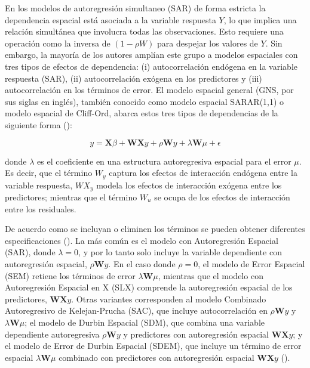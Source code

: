 \documentclass[
  manuscript=article,  
  layout=preprint,  
  year=2023,
  volume=0,
]{format}
\begin{document}
En los modelos de autoregresión simultaneo (SAR) de forma estricta la dependencia espacial está asociada a la variable respuesta $Y$, lo que implica una relación simultánea que involucra todas las observaciones. Esto requiere una operación como la inversa de $(1-\rho W)$ para despejar los valores de $Y$. Sin embargo, la mayoría de los autores amplían este grupo a modelos espaciales con tres tipos de efectos de dependencia: (i) autocorrelación endógena en la variable respuesta (SAR), (ii) autocorrelación exógena en los predictores y (iii) autocorrelación en los términos de error. El modelo espacial general (GNS, por sus siglas en inglés), también conocido como modelo espacial SARAR(1,1) o modelo espacial de Cliff-Ord, abarca estos tres tipos de dependencias de la siguiente forma (\cite{lesage2009introduction, kelejian2007relative, cliff1981spatial}):

\begin{equation} \label{eq:2} y = \textbf{X} \beta + \textbf{W} \textbf{X} y + \rho \textbf{W} y + \lambda \textbf{W} \mu + \epsilon \end{equation}

\par donde $\lambda$ es el coeficiente en una estructura autoregresiva espacial para el error $\mu$. Es decir, que el término $W_y$ captura los efectos de interacción endógena entre la variable respuesta,  $WX_y$ modela los efectos de interacción exógena entre los predictores; mientras que el término $W_u$ se ocupa de los efectos de interacción entre los residuales.

\par De acuerdo como se incluyan o eliminen los términos se pueden obtener diferentes especificaciones (\cite{elhorst2013spatial}). La más común es el modelo con Autoregresión Espacial (SAR), donde $\lambda=0$, y por lo tanto solo incluye la variable dependiente con autoregresión espacial, $\rho \textbf{W}y$. En el caso donde $\rho=0$, el modelo de Error Espacial (SEM) retiene los términos de error $\lambda \textbf{W} \mu$, mientras que el modelo con Autoregresión Espacial en X (SLX) comprende la autoregresión espacial de los predictores, $\textbf{W} \textbf{X} y$. Otras variantes corresponden al modelo Combinado Autoregresivo de Kelejan-Prucha (SAC), que incluye autocorrelación en $\rho \textbf{W} y$ y $\lambda \textbf{W} \mu$; el modelo de Durbin Espacial (SDM), que combina una variable dependiente autoregresiva $\rho \textbf{W} y$ y predictores con autoregresión espacial $\textbf{W} \textbf{X} y$; y el modelo de Error de Durbin Espacial (SDEM), que incluye un término de error espacial $\lambda \textbf{W} \mu$ combinado con predictores con autoregresión espacial $\textbf{W} \textbf{X} y$ (\cite{elhorst2022dynamic, anselin2022spatial}).
\end{document}
